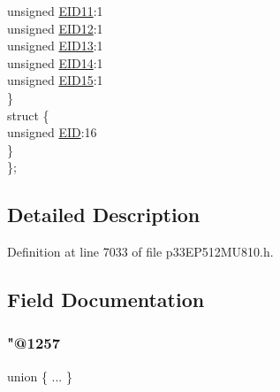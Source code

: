 \begin{DoxyCompactItemize}
\begin{tabbing}
\>\>unsigned \hyperlink{structtag_c2_r_x_f14_e_i_d_b_i_t_s_a710bdb0d602deb021b0be99066008018}{EID11}:1\\
\>\>unsigned \hyperlink{structtag_c2_r_x_f14_e_i_d_b_i_t_s_aa347bb85867bd8d4e0124f7cff8c6472}{EID12}:1\\
\>\>unsigned \hyperlink{structtag_c2_r_x_f14_e_i_d_b_i_t_s_a37d5f3edcbf6ef62f848fd4f3c584f79}{EID13}:1\\
\>\>unsigned \hyperlink{structtag_c2_r_x_f14_e_i_d_b_i_t_s_a7ffc0b0e0d99b8476b6f9a45337c17ab}{EID14}:1\\
\>\>unsigned \hyperlink{structtag_c2_r_x_f14_e_i_d_b_i_t_s_a293cd7dc1746257fa75a60cbd9383cd7}{EID15}:1\\
\>\} \\
\>struct \{\\
\>\>unsigned \hyperlink{structtag_c2_r_x_f14_e_i_d_b_i_t_s_ae80b378c9141f7c03e0b4e55b5f4b54d}{EID}:16\\
\>\} \\
\}; \\

\end{tabbing}\end{DoxyCompactItemize}


\subsection{Detailed Description}


Definition at line 7033 of file p33\+E\+P512\+M\+U810.\+h.



\subsection{Field Documentation}
\mbox{\label{structtag_c2_r_x_f14_e_i_d_b_i_t_s_a68ae15c29ac4d188b5b3ff57fe6ef765}} 
\subsubsection{\texorpdfstring{"@1257}{@1257}}
{\footnotesize\ttfamily union \{ ... \} }

\mbox{\label{structtag_c2_r_x_f14_e_i_d_b_i_t_s_ae80b378c9141f7c03e0b4e55b5f4b54d}} 
